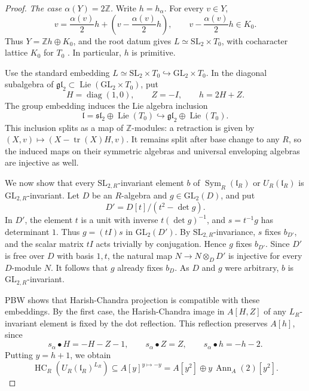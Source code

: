 \documentclass[twoside,a4paper,12pt,reqno]{amsart}
\theoremstyle{remark}
\numberwithin{equation}{section}
\newcommand{\Z}{\mathbb Z}
\newcommand{\fl}{\mathfrak l}
\DeclareMathOperator{\Sym}{Sym}
\DeclareMathOperator{\Lie}{Lie}
\DeclareMathOperator{\HC}{HC}
\DeclareMathOperator{\Ann}{Ann}
\begin{document}
\begin{proof}
\smallskip
\noindent\emph{The case \(\alpha(Y)=2\Z\).}
Write \(h=h_\alpha\). For every \(v\in Y\),
\[
v=\frac{\alpha(v)}2h+
\left(v-\frac{\alpha(v)}2h\right),\qquad
v-\frac{\alpha(v)}2h\in K_0.
\]
Thus \(Y=\Z h\oplus K_0\), and the root datum gives
\(L\simeq\mathrm{SL}_2\times T_0\), with cocharacter lattice \(K_0\)
for \(T_0\) \cite[Thm.~6.1.17]{Conrad}. In particular, \(h\) is primitive.

Use the standard embedding
\(L\simeq\mathrm{SL}_2\times T_0\hookrightarrow\mathrm{GL}_2\times T_0\).
In the diagonal subalgebra of
\(\mathfrak{gl}_2\subset\Lie(\mathrm{GL}_2\times T_0)\), put
\[
H=\operatorname{diag}(1,0),\qquad Z=-I,\qquad h=2H+Z.
\]
The group embedding induces the Lie algebra inclusion
\[
\fl=\mathfrak{sl}_2\oplus\Lie(T_0)
\hookrightarrow\mathfrak{gl}_2\oplus\Lie(T_0).
\]
This inclusion splits as a map of \(\Z\)-modules: a retraction is given by
\((X,v)\mapsto(X-\operatorname{tr}(X)H,v)\).
It remains split after base change to any \(R\), so the induced maps
on their symmetric algebras and universal enveloping algebras are injective as well.

We now show that every \(\mathrm{SL}_{2,R}\)-invariant element \(b\)
of \(\Sym_R(\fl_R)\) or \(U_R(\fl_R)\) is
\(\mathrm{GL}_{2,R}\)-invariant.
Let \(D\) be an \(R\)-algebra and \(g\in\mathrm{GL}_2(D)\), and put
\[
D'=D[t]/(t^2-\det g).
\]
In \(D'\), the element \(t\) is a unit with inverse
\(t(\det g)^{-1}\), and \(s=t^{-1}g\) has determinant \(1\).
Thus \(g=(tI)s\) in \(\mathrm{GL}_2(D')\).
By \(\mathrm{SL}_{2,R}\)-invariance, \(s\) fixes \(b_{D'}\),
and the scalar matrix \(tI\) acts trivially by conjugation.
Hence \(g\) fixes \(b_{D'}\).
Since \(D'\) is free over \(D\) with basis \(1,t\), the natural map
\(N\to N\otimes_D D'\) is injective for every \(D\)-module \(N\).
It follows that \(g\) already fixes \(b_D\).
As \(D\) and \(g\) were arbitrary, \(b\) is
\(\mathrm{GL}_{2,R}\)-invariant.

PBW shows that Harish-Chandra projection is compatible with these
embeddings. By the first case, the Harish-Chandra image in
\(A[H,Z]\) of any \(L_R\)-invariant element is fixed by the dot
reflection. This reflection preserves \(A[h]\), since
\[
s_\alpha\bullet H=-H-Z-1,\qquad s_\alpha\bullet Z=Z,\qquad
s_\alpha\bullet h=-h-2.
\]
Putting \(y=h+1\), we obtain
\begin{equation}\label{eq:sl2-dot-invariants}
\HC_R(U_R(\fl_R)^{L_R})
\subseteq A[y]^{y\mapsto-y}
=A[y^2]\oplus y\,\Ann_A(2)[y^2].
\end{equation}


\end{proof}
\end{document}
